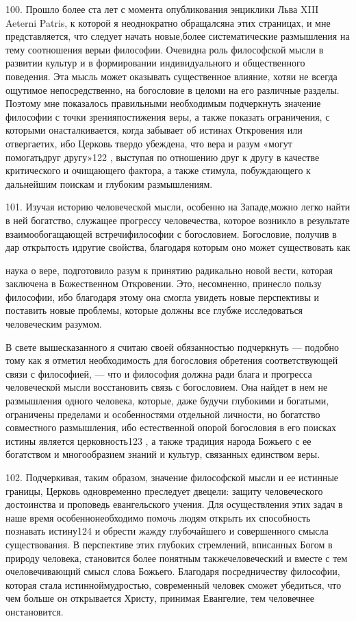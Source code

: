 \documentclass[a5paper,10pt]{article}
\begin{document}
100. Прошло более ста лет с момента опубликования энциклики Льва XIII Aeterni
Patris, к которой я неоднократно обращалсяна этих страницах, и мне
представляется, что следует начать новые,более систематические размышления на
тему соотношения верыи философии. Очевидна роль философской мысли в развитии
культур и в формировании индивидуального и общественного поведения. Эта мысль
может оказывать существенное влияние, хотяи не всегда ощутимое непосредственно,
на богословие в целоми на его различные разделы. Поэтому мне показалось
правильными необходимым подчеркнуть значение философии с точки зренияпостижения
веры, а также показать ограничения, с которыми онасталкивается, когда забывает
об истинах Откровения или отвергаетих, ибо Церковь твердо убеждена, что вера и
разум «могут помогатьдруг другу»122 , выступая по отношению друг к другу в
качестве критического и очищающего фактора, а также стимула, побуждающего к
дальнейшим поискам и глубоким размышлениям.

101. Изучая историю человеческой мысли, особенно на Западе,можно легко найти в
ней богатство, служащее прогрессу человечества, которое возникло в результате
взаимообогащающей встречифилософии с богословием. Богословие, получив в дар
открытость идругие свойства, благодаря которым оно может существовать как

наука о вере, подготовило разум к принятию радикально новой вести, которая
заключена в Божественном Откровении. Это, несомненно, принесло пользу
философии, ибо благодаря этому она смогла увидеть новые перспективы и поставить
новые проблемы, которые должны все глубже исследоваться человеческим разумом.

В свете вышесказанного я считаю своей обязанностью подчеркнуть — подобно тому
как я отметил необходимость для богословия обретения соответствующей связи с
философией, — что и философия должна ради блага и прогресса человеческой мысли
восстановить связь с богословием. Она найдет в нем не размышления одного
человека, которые, даже будучи глубокими и богатыми, ограничены пределами и
особенностями отдельной личности, но богатство совместного размышления, ибо
естественной опорой богословия в его поисках истины является церковность123 , а
также традиция народа Божьего с ее богатством и многообразием знаний и культур,
связанных единством веры.

102. Подчеркивая, таким образом, значение философской мысли и ее истинные
границы, Церковь одновременно преследует двецели: защиту человеческого
достоинства и проповедь евангельского учения. Для осуществления этих задач в
наше время особеннонеобходимо помочь людям открыть их способность познавать
истину124 и обрести жажду глубочайшего и совершенного смысла существования. В
перспективе этих глубоких стремлений, вписанных Богом в природу человека,
становится более понятным такжечеловеческий и вместе с тем очеловечивающий
смысл слова Божьего. Благодаря посредничеству философии, которая стала
истинноймудростью, современный человек сможет убедиться, что чем больше он
открывается Христу, принимая Евангелие, тем человечнее онстановится.
\end{document}
